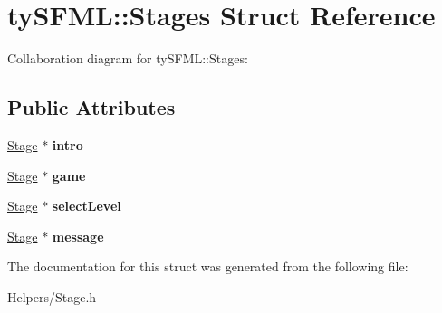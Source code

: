 \hypertarget{structty_s_f_m_l_1_1_stages}{}\section{ty\+S\+F\+M\+L\+:\+:Stages Struct Reference}
\label{structty_s_f_m_l_1_1_stages}


Collaboration diagram for ty\+S\+F\+M\+L\+:\+:Stages\+:
\subsection*{Public Attributes}
\begin{DoxyCompactItemize}
\item 
\hypertarget{structty_s_f_m_l_1_1_stages_a37df67636962ae48150af06df6fac17f}{}\hyperlink{classty_s_f_m_l_1_1_stage}{Stage} $\ast$ {\bfseries intro}\label{structty_s_f_m_l_1_1_stages_a37df67636962ae48150af06df6fac17f}

\item 
\hypertarget{structty_s_f_m_l_1_1_stages_aec257e4543160d5a1a32cfbfc9c83504}{}\hyperlink{classty_s_f_m_l_1_1_stage}{Stage} $\ast$ {\bfseries game}\label{structty_s_f_m_l_1_1_stages_aec257e4543160d5a1a32cfbfc9c83504}

\item 
\hypertarget{structty_s_f_m_l_1_1_stages_a679aa60c7482f93172919d0a0a05c3a0}{}\hyperlink{classty_s_f_m_l_1_1_stage}{Stage} $\ast$ {\bfseries select\+Level}\label{structty_s_f_m_l_1_1_stages_a679aa60c7482f93172919d0a0a05c3a0}

\item 
\hypertarget{structty_s_f_m_l_1_1_stages_a1e2f9c0b180b5d7b222f4cecc62fd08e}{}\hyperlink{classty_s_f_m_l_1_1_stage}{Stage} $\ast$ {\bfseries message}\label{structty_s_f_m_l_1_1_stages_a1e2f9c0b180b5d7b222f4cecc62fd08e}

\end{DoxyCompactItemize}


The documentation for this struct was generated from the following file\+:\begin{DoxyCompactItemize}
\item 
Helpers/Stage.\+h\end{DoxyCompactItemize}

